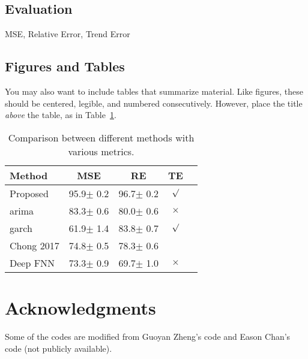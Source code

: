 \documentclass{article}
\begin{document}
\subsection{Evaluation}
MSE, Relative Error, Trend Error

\subsection{Figures and Tables}
 
You may also want to include tables that summarize material. Like 
figures, these should be centered, legible, and numbered consecutively. 
However, place the title {\it above\/} the table, as in 
Table~\ref{sample-table}.

\begin{table}[t]
\caption{Comparison between different methods with various metrics.}
\label{sample-table}
\vskip 0.15in
\begin{center}
\begin{small}
\begin{sc}
\begin{tabular}{lcccr}
\hline
\abovespace\belowspace
Method & MSE & RE & TE \\
\hline
\abovespace
Proposed   & 95.9$\pm$ 0.2& 96.7$\pm$ 0.2& $\surd$  \\
arima      & 83.3$\pm$ 0.6& 80.0$\pm$ 0.6& $\times$ \\
garch      & 61.9$\pm$ 1.4& 83.8$\pm$ 0.7& $\surd$  \\
Chong 2017 & 74.8$\pm$ 0.5& 78.3$\pm$ 0.6&          \\
\belowspace
Deep FNN   & 73.3$\pm$ 0.9& 69.7$\pm$ 1.0& $\times$ \\
\hline
\end{tabular}
\end{sc}
\end{small}
\end{center}
\vskip -0.1in
\end{table}

\section*{Acknowledgments} 
Some of the codes are modified from Guoyan Zheng's code and Eason Chan's code (not publicly available).



\end{document}
